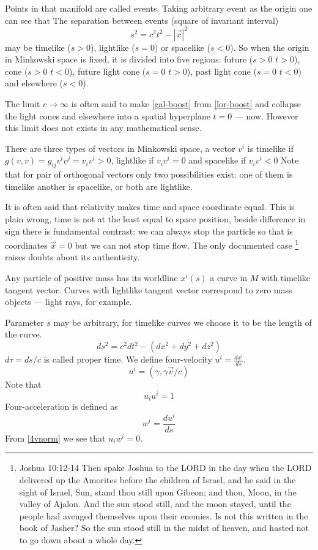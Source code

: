 Points in that manifold are called events. Taking arbitrary 
event as the origin one can see that
The separation between events (square of invariant interval) 
\begin{equation}
   \label {interval}
    s^2=c^2 t^2-|\vec x|^2
\end{equation}
may be timelike ($s>0$), lightlike ($s=0$) or spacelike ($s<0$).
So when the origin in Minkowski space is fixed, it is divided into
five regions: future ($ s>0 $ $ t>0 $), cone ($ s>0 $ $ t<0 $),
future light cone ($ s=0 $ $ t>0 $), past light cone ($ s=0 $ $ t<0 $)
and elsewhere ($ s<0 $).

The limit $c \to \infty$ is often said to make \eqref{gal-boost} 
from \eqref{lor-boost} 
and collapse the light cones and elsewhere 
into a spatial hyperplane $ t=0 $ --- now. However this limit
does not exists in any mathematical sense. 

There are three types of vectors in Minkowski space,
a vector $v^i$ is timelike if $g(v,v)= g_{ij} v^i v^j=v_i v^i>0$,
lightlike if $v_i v^i=0$ and spacelike if $v_i v^i<0$
Note that for pair of orthogonal vectors only two possibilities exist:
one of them is timelike another is spacelike, or both are lightlike.


It is often said that relativity makes time and space coordinate equal. 
This is plain wrong,
time is not at the least equal to space position, beside difference in sign there is fundamental contrast: we can always stop the particle so
that is coordinates $ \vec x=0 $ but we can not stop time flow. The only documented case \footnote {
Joshua 10:12-14
Then spake Joshua to the LORD in the day when the LORD delivered 
up the Amorites before the children of Israel, and he said in the 
sight of Israel, Sun, stand thou still upon Gibeon; and thou, 
Moon, in the valley of Ajalon.
And the sun stood still, and the moon stayed, until the people 
had avenged themselves upon their enemies. Is not this written 
in the book of Jasher? So the sun stood still in the midst of heaven,
and hasted not to go down about a whole day.} 
raises doubts about its authenticity.

Any  particle of positive mass has its worldline $x^i(s)$ a curve in $M$ 
with timelike tangent vector. Curves with lightlike tangent vector 
correspond to zero mass objects --- light rays, for example.  

Parameter $ s $ may be arbitrary, for timelike curves we choose it to be the
length of the curve.
\begin{equation}
   \label {int4}
   ds^2=c^2 dt^2-(dx^2+dy^2+dz^2)
\end{equation}
$ d \tau = ds/c $ is called proper time.
We define four-velocity $u^i = \frac{dx^i}{ds}$.
\begin{equation}
   \label {vel4}
    u^i=(\gamma,\gamma \vec v/c)
\end{equation}
Note that 
\begin{equation}
   \label {4vnorm}
u_i u^i=1
\end{equation} 
Four-acceleration is defined as 
\begin{equation}
   \label {4acc}
 w^i = \frac{du^i}{ds}  
\end{equation}
From \eqref{4vnorm} we see that $ u_i w^i=0 $.

